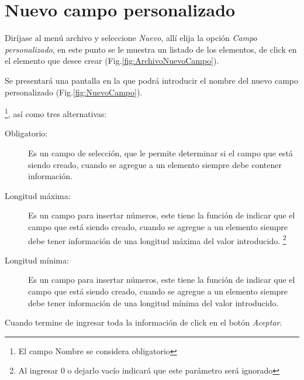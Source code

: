 \section{Nuevo campo personalizado}
\label{sec:nuevoCampo}
Dir\'ijase al men\'u archivo y seleccione \emph{Nuevo}, all\'i elija la opci\'on \emph{Campo personalizado}, en este punto se le muestra un listado de los elementos, de click en el elemento que desee crear (Fig.\ref{fig:ArchivoNuevoCampo}). 
  

Se presentar\'a una pantalla en la que podr\'a introducir el nombre del nuevo
campo personalizado (Fig.\ref{fig:NuevoCampo}). 
  

\footnote{El campo Nombre se considera obligatorio},
as\'i como tres
alternativas:
\begin{description}
\item[Obligatorio:]Es un campo de selecci\'on, que le permite determinar si el
campo que est\'a siendo creado, cuando se agregue a un elemento siempre
debe contener informaci\'on.
\item[Longitud m\'axima:]Es un campo para insertar n\'umeros, este tiene la
funci\'on de indicar que el campo que est\'a siendo creado, cuando se agregue a un elemento siempre debe tener informaci\'on de una longitud
m\'axima del valor introducido.
\footnote{Al ingresar 0 o dejarlo vac\'io indicar\'a que este par\'ametro
ser\'a ignorado}
\item[Longitud m\'inima:]Es un campo para insertar n\'umeros, este tiene la
funci\'on de indicar que el campo que est\'a siendo creado, cuando se agregue a un elemento siempre debe tener informaci\'on de una longitud
m\'inima del valor introducido.
\footnotemark[\value{footnote}]
\end{description}

Cuando termine de ingresar toda la informaci\'on de click en el bot\'on \emph{Aceptar}.